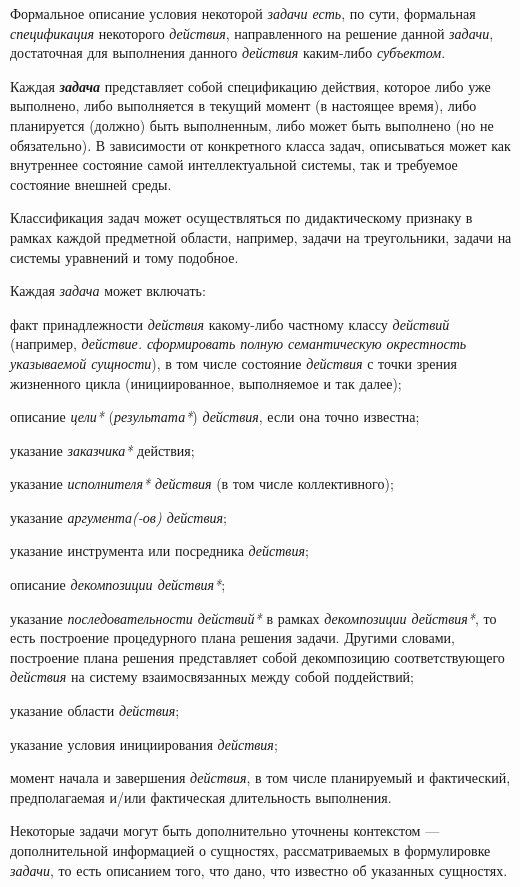 Формальное описание условия некоторой \textit{задачи есть}, по сути, формальная \textit{спецификация} некоторого \textit{действия}, направленного на решение данной \textit{задачи}, достаточная для выполнения данного \textit{действия} каким-либо \textit{субъектом}.

Каждая \textbf{\textit{задача}} представляет собой спецификацию действия, которое либо уже выполнено, либо выполняется в текущий момент (в настоящее время), либо планируется (должно) быть выполненным, либо может быть выполнено (но не обязательно). В зависимости от конкретного класса задач, описываться может как внутреннее состояние самой интеллектуальной системы, так и требуемое состояние внешней среды.

Классификация задач может осуществляться по дидактическому признаку в рамках каждой предметной области, например, задачи на треугольники, задачи на системы уравнений и тому подобное.

Каждая \textit{задача} может включать:
\begin{textitemize}
	\item факт принадлежности \textit{действия} какому-либо частному классу \textit{действий} (например,\textit{ действие. сформировать полную семантическую окрестность указываемой сущности}), в том числе состояние \textit{действия} с точки зрения жизненного цикла (инициированное, выполняемое и так далее);
	\item описание \textit{цели*} (\textit{результата*}) \textit{действия}, если она точно известна;
	\item указание \textit{заказчика*} действия;
	\item указание \textit{исполнителя* действия} (в том числе коллективного);
	\item указание \textit{аргумента(-ов) действия\scnrolesign};
	\item указание инструмента или посредника \textit{действия};
	\item описание \textit{декомпозиции действия*};
	\item указание \textit{последовательности действий*} в рамках \textit{декомпозиции действия*}, то есть построение процедурного плана решения задачи. Другими словами, построение плана решения представляет собой декомпозицию соответствующего \textit{действия} на систему взаимосвязанных между собой поддействий;
	\item указание области \textit{действия};
	\item указание условия инициирования \textit{действия};
	\item момент начала и завершения \textit{действия}, в том числе планируемый и фактический, предполагаемая и/или фактическая длительность выполнения.
\end{textitemize}
Некоторые задачи могут быть дополнительно уточнены контекстом --- дополнительной информацией о сущностях, рассматриваемых в формулировке \textit{задачи}, то есть описанием того, что дано, что известно об указанных сущностях.

